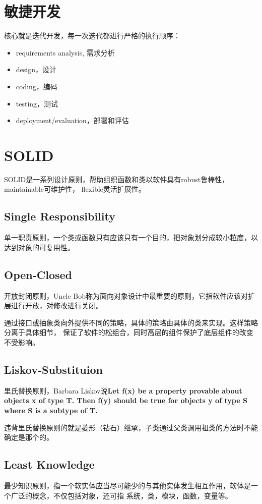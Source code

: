 \section{敏捷开发}
核心就是迭代开发，每一次迭代都进行严格的执行顺序：
\begin{itemize}
    \item {requirements analysis, 需求分析}
    \item {design，设计}
    \item {coding，编码}
    \item {testing，测试}
    \item {deployment/evaluation，部署和评估}
\end{itemize}

\section{SOLID}

SOLID是一系列设计原则，帮助组织函数和类以软件具有robust鲁棒性，maintainable可维护性，
flexible灵活扩展性。

\subsection{Single Responsibility}
单一职责原则，一个类或函数只有应该只有一个目的，把对象划分成较小粒度，以达到对象的可复用性。

\subsection{Open-Closed}
开放封闭原则，Uncle Bob称为面向对象设计中最重要的原则，它指软件应该对扩展进行开放，对修改进行关闭。

通过接口或抽象类向外提供不同的策略，具体的策略由具体的类来实现。这样策略分离于具体细节，
保证了软件的松组合，同时高层的组件保护了底层组件的改变不受影响。

\subsection{Liskov-Substituion}
里氏替换原则，Barbara Liskov说\textbf{Let f(x) be a property provable about objects x of type T.
Then f(y) should be true for objects y of type S where S is a subtype of T.}

违背里氏替换原则的就是菱形（钻石）继承，子类通过父类调用祖类的方法时不能确定是那个的。

\subsection{Least Knowledge}
最少知识原则，指一个软实体应当尽可能少的与其他实体发生相互作用，软体是一个广泛的概念，不仅包括对象，还可指
系统，类，模块，函数，变量等。

